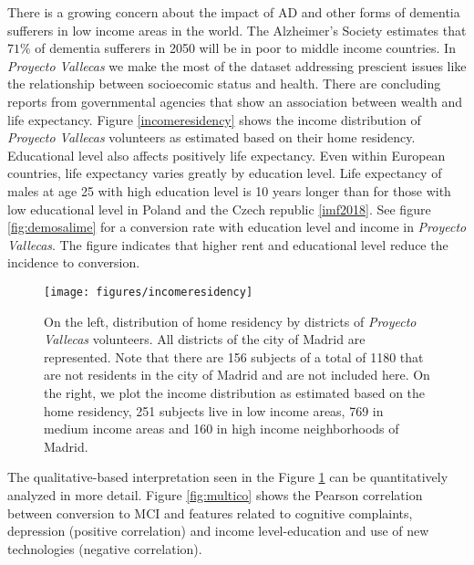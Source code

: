 \documentclass[11pt]{article}
\theoremstyle{definition}
\theoremstyle{remark}
\begin{document}
There is a growing concern about the impact of AD and other forms of dementia sufferers in low income areas in the world.
The Alzheimer’s Society estimates that $71\%$ of dementia sufferers in 2050 will be in poor to middle income countries.
In \emph{Proyecto Vallecas} we make the most of the dataset addressing prescient issues like the relationship between socioecomic status and health. There are concluding reports from governmental agencies that show an association between wealth and life expectancy. 
Figure \ref{incomeresidency} shows the income distribution of \emph{Proyecto Vallecas} volunteers as estimated based on their home residency. 
Educational level also affects positively life expectancy. Even within European countries, life expectancy varies greatly by education level. Life expectancy of males at age 25 with high education level is 10 years longer than for those with low educational level in Poland and the Czech republic \ref{imf2018}. 
See figure \ref{fig:demosalime} for a conversion rate with education level and income in \emph{Proyecto Vallecas}. The figure indicates that higher rent and educational level reduce the incidence to conversion. 
\begin{figure}[H]
        \centering
        \texttt{[image: figures/incomeresidency]}
        \caption{On the left, distribution of home residency by districts of \emph{Proyecto Vallecas} volunteers. All districts of the city of Madrid are represented. Note that there are 156 subjects of a total of 1180 that are not residents in the city of Madrid and are not included here. On the right, we plot the income distribution as estimated based on the home residency, 251 subjects live in low income areas, 769 in medium income areas and 160 in high income neighborhoods of Madrid.
        } \label{fig:incomeresidency}
\end{figure}

The qualitative-based interpretation seen in the Figure \ref{fig:incomeresidency} can be quantitatively analyzed in more detail. Figure \ref{fig:multico} shows the Pearson correlation between conversion to MCI and features related to cognitive complaints, depression (positive correlation) and income level-education and use of new technologies (negative correlation).
\end{document}
